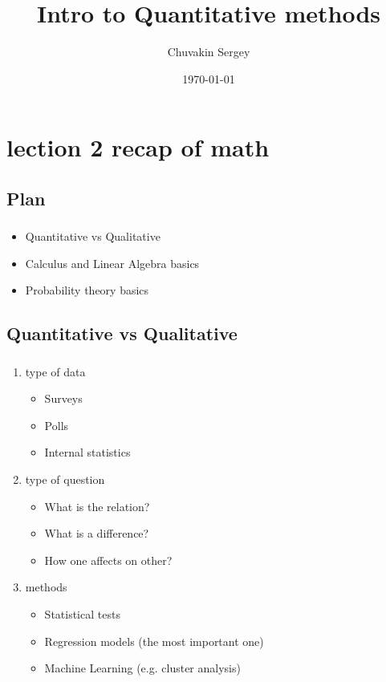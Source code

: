 \documentclass[t, 11pt]{beamer}
\title{Intro to Quantitative methods}
\subtitle{}
\author{Chuvakin Sergey}
\date{\today}
\institute[<<Anthropology>>]{<<School of Advanced Studies>>}
\begin{document}
	
	\frame[plain]{\titlepage}
	\section{lection 2 recap of math}
	
	
	\subsection{Plan}
	\begin{frame} 
		\frametitle{\insertsection} 
		\frametitle{\insertsubsection} 
		\begin{itemize}
			\item Quantitative vs Qualitative
			\item Calculus and Linear Algebra basics 
			\item Probability theory basics
		\end{itemize}
	\end{frame}
	
	\subsection{Quantitative vs Qualitative}
	\begin{frame} 
		\frametitle{\insertsection} 
		\frametitle{\insertsubsection} 
		\begin{enumerate}
			\item type of data
			\begin{itemize}
				\item Surveys 
				\item Polls
				\item Internal statistics
			\end{itemize}
			\item type of question 
			\begin{itemize}
				\item What is the relation?
				\item What is a difference?
				\item How one affects on other?
			\end{itemize}
			\item methods
			\begin{itemize}
				\item Statistical tests 
				\item Regression models (the most important one)
				\item Machine Learning (e.g. cluster analysis)
			\end{itemize}
		\end{enumerate}
	\end{frame}
	
\end{document}
